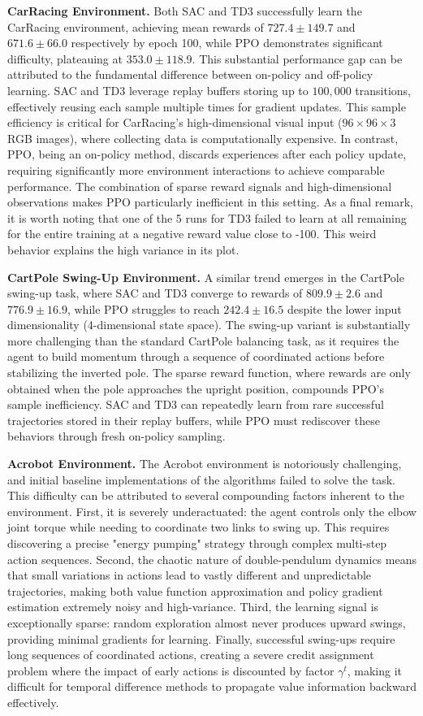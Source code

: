 \documentclass{article}
\begin{document}
\textbf{CarRacing Environment.} Both SAC and TD3 successfully learn the CarRacing environment, achieving mean rewards of $727.4 \pm 149.7$ and $671.6 \pm 66.0$ respectively by epoch 100, while PPO demonstrates significant difficulty, plateauing at $353.0 \pm 118.9$. This substantial performance gap can be attributed to the fundamental difference between on-policy and off-policy learning. SAC and TD3 leverage replay buffers storing up to $100,000$ transitions, effectively reusing each sample multiple times for gradient updates. This sample efficiency is critical for CarRacing's high-dimensional visual input ($96 \times 96 \times 3$ RGB images), where collecting data is computationally expensive. In contrast, PPO, being an on-policy method, discards experiences after each policy update, requiring significantly more environment interactions to achieve comparable performance. The combination of sparse reward signals and high-dimensional observations makes PPO particularly inefficient in this setting. As a final remark, it is worth noting that one of the 5 runs for TD3 failed to learn at all remaining for the entire training at a negative reward value close to -100. This weird behavior explains the high variance in its plot.

\textbf{CartPole Swing-Up Environment.} A similar trend emerges in the CartPole swing-up task, where SAC and TD3 converge to rewards of $809.9 \pm 2.6$ and $776.9 \pm 16.9$, while PPO struggles to reach $242.4 \pm 16.5$ despite the lower input dimensionality (4-dimensional state space). The swing-up variant is substantially more challenging than the standard CartPole balancing task, as it requires the agent to build momentum through a sequence of coordinated actions before stabilizing the inverted pole. The sparse reward function, where rewards are only obtained when the pole approaches the upright position, compounds PPO's sample inefficiency. SAC and TD3 can repeatedly learn from rare successful trajectories stored in their replay buffers, while PPO must rediscover these behaviors through fresh on-policy sampling.

\textbf{Acrobot Environment.} The Acrobot environment is notoriously challenging, and initial baseline implementations of the algorithms failed to solve the task. This difficulty can be attributed to several compounding factors inherent to the environment. First, it is severely underactuated: the agent controls only the elbow joint torque while needing to coordinate two links to swing up. This requires discovering a precise "energy pumping" strategy through complex multi-step action sequences. Second, the chaotic nature of double-pendulum dynamics means that small variations in actions lead to vastly different and unpredictable trajectories, making both value function approximation and policy gradient estimation extremely noisy and high-variance. Third, the learning signal is exceptionally sparse: random exploration almost never produces upward swings, providing minimal gradients for learning. Finally, successful swing-ups require long sequences of coordinated actions, creating a severe credit assignment problem where the impact of early actions is discounted by factor $\gamma^t$, making it difficult for temporal difference methods to propagate value information backward effectively.
\end{document}
